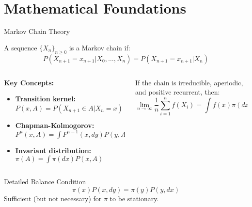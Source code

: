 \documentclass[aspectratio=169,11pt]{beamer}
\begin{document}
\section{Mathematical Foundations}

\begin{frame}{Markov Chain Theory}
\begin{definition}
A sequence $\{X_n\}_{n \geq 0}$ is a Markov chain if:
\[P(X_{n+1} = x_{n+1} | X_0, \ldots, X_n) = P(X_{n+1} = x_{n+1} | X_n)\]
\end{definition}

\begin{columns}
\begin{column}{0.5\textwidth}
\textbf{Key Concepts:}
\begin{itemize}
\item \textbf{Transition kernel:} $P(x, A) = P(X_{n+1} \in A | X_n = x)$
\item \textbf{Chapman-Kolmogorov:} $P^n(x,A) = \int P^{n-1}(x,dy) P(y,A)$
\item \textbf{Invariant distribution:} $\pi(A) = \int \pi(dx) P(x,A)$
\end{itemize}
\end{column}
\begin{column}{0.5\textwidth}
\begin{theorem}
If the chain is irreducible, aperiodic, and positive recurrent, then:
\[\lim_{n \to \infty} \frac{1}{n} \sum_{i=1}^n f(X_i) = \int f(x) \pi(dx) \quad \text{a.s.}\]
\end{theorem}
\end{column}
\end{columns}

\vspace{0.3cm}
\begin{block}{Detailed Balance Condition}
\[\pi(x) P(x, dy) = \pi(y) P(y, dx)\]
Sufficient (but not necessary) for $\pi$ to be stationary.
\end{block}
\end{frame}
\end{document}
